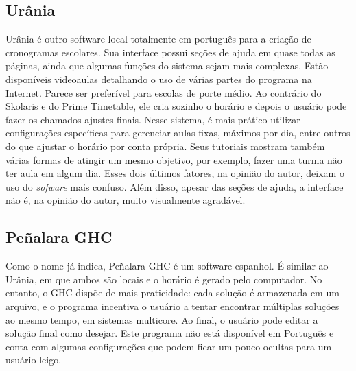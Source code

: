 \documentclass[12pt,a4paper]{article}
\begin{document}
		\subsection{Urânia}

			\par Urânia é outro software local totalmente em português para a criação de cronogramas escolares. Sua interface possui seções de ajuda em quase todas as páginas, ainda que algumas funções do sistema sejam mais complexas. Estão disponíveis videoaulas detalhando o uso de várias partes do programa na Internet. Parece ser preferível para escolas de porte médio. Ao contrário do Skolaris e do Prime Timetable, ele cria sozinho o horário e depois o usuário pode fazer os chamados ajustes finais. Nesse sistema, é mais prático utilizar configurações específicas para gerenciar aulas fixas, máximos por dia, entre outros do que ajustar o horário por conta própria. Seus tutoriais mostram também várias formas de atingir um mesmo objetivo, por exemplo, fazer uma turma não ter aula em algum dia. Esses dois últimos fatores, na opinião do autor, deixam o uso do \textit{sofware} mais confuso. Além disso, apesar das seções de ajuda, a interface não é, na opinião do autor, muito visualmente agradável.

		\subsection{Peñalara GHC}

			\par Como o nome já indica, Peñalara GHC é um software espanhol. É similar ao Urânia, em que ambos são locais e o horário é gerado pelo computador. No entanto, o GHC dispõe de mais praticidade: cada solução é armazenada em um arquivo, e o programa incentiva o usuário a tentar encontrar múltiplas soluções ao mesmo tempo, em sistemas multicore. Ao final, o usuário pode editar a solução final como desejar. Este programa não está disponível em Português e conta com algumas configurações que podem ficar um pouco ocultas para um usuário leigo.

		\vspace{1cm}

\end{document}
